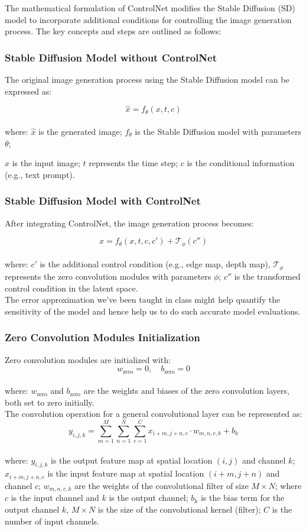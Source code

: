 \documentclass[12pt]{article}
\begin{document}
The mathematical formulation of ControlNet modifies the Stable Diffusion (SD) model to incorporate additional conditions for controlling the image generation process. The key concepts and steps are outlined as follows:

\subsubsection*{Stable Diffusion Model without ControlNet}

The original image generation process using the Stable Diffusion model can be expressed as:

\[ \hat{x} = f_\theta(x, t, c) \]
\\
where: $\hat{x}$ is the generated image; $f_\theta$ is the Stable Diffusion model with parameters $\theta$; \item $x$ is the input image; $t$ represents the time step; $c$ is the conditional information (e.g., text prompt).

\subsubsection*{Stable Diffusion Model with ControlNet}

After integrating ControlNet, the image generation process becomes:

\[
\hat{x} = f_\theta(x, t, c, c') + \mathcal{T}_\phi(c'')
\]
\\
where: $c'$ is the additional control condition (e.g., edge map, depth map), $\mathcal{T}_\phi$ represents the zero convolution modules with parameters $\phi$; $c''$ is the transformed control condition in the latent space.
\\
The error approximation we've been taught in class might help quantify the sensitivity of the model and hence help us to do such accurate model evaluations.

\subsubsection*{Zero Convolution Modules Initialization}

Zero convolution modules are initialized with:
\[ w_{\text{zero}} = 0, \quad b_{\text{zero}} = 0 \]
\\
where: $w_{\text{zero}}$ and $b_{\text{zero}}$ are the weights and biases of the zero convolution layers, both set to zero initially.
\\
The convolution operation for a general convolutional layer can be represented as:
\[
y_{i, j, k} = \sum_{m=1}^{M} \sum_{n=1}^{N} \sum_{c=1}^{C} x_{i+m, j+n, c} \cdot w_{m, n, c, k} + b_k
\]
\\
where: $y_{i, j, k}$ is the output feature map at spatial location $(i, j)$ and channel $k$; $x_{i+m, j+n, c}$ is the input feature map at spatial location $(i+m, j+n)$ and channel $c$; $w_{m, n, c, k}$ are the weights of the convolutional filter of size $M \times N$; where $c$ is the input channel and $k$ is the output channel; $b_k$ is the bias term for the output channel $k$, $M \times N$ is the size of the convolutional kernel (filter); $C$ is the number of input channels.
\end{document}
